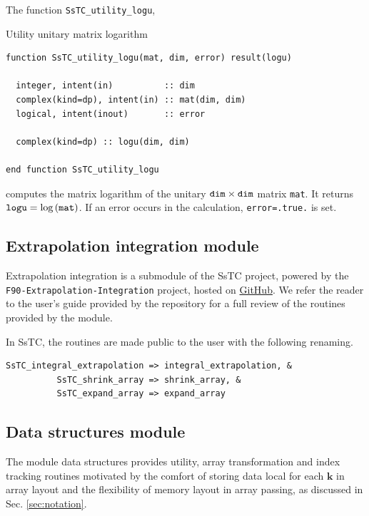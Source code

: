 \documentclass[10pt,a4paper]{article}
\begin{document}
The function \verb|SsTC_utility_logu|,
\begin{codebox}{Utility unitary matrix logarithm}
\begin{lstlisting}[caption={Interface of ``utility logarithm of matrix".},captionpos=b]
function SsTC_utility_logu(mat, dim, error) result(logu)

  integer, intent(in)          :: dim
  complex(kind=dp), intent(in) :: mat(dim, dim)
  logical, intent(inout)       :: error

  complex(kind=dp) :: logu(dim, dim)
  
end function SsTC_utility_logu
\end{lstlisting}
\end{codebox}
computes the matrix logarithm of the unitary $\verb|dim|\times\verb|dim|$ matrix \verb|mat|. It returns $\verb|logu| = \text{log}\left(\verb|mat|\right)$. If an error occurs in the calculation, \verb|error=.true.| is set.
\subsection{Extrapolation integration module}
Extrapolation integration is a submodule of the SsTC project, powered by the \\ \verb|F90-Extrapolation-Integration| project, hosted on \href{https://github.com/irukoa/F90-Extrapolation-Integration}{GitHub}. We refer the reader to the user's guide provided by the repository for a full review of the routines provided by the module.

In SsTC, the routines are made public to the user with the following renaming.
\begin{codebox}{}
\begin{lstlisting}[caption={Renaming of extrapolation routines.},captionpos=b]
SsTC_integral_extrapolation => integral_extrapolation, &
          SsTC_shrink_array => shrink_array, &
          SsTC_expand_array => expand_array
\end{lstlisting}
\end{codebox}
\subsection{Data structures module}\label{sec:data_structures}
The module data structures provides utility, array transformation and index tracking routines motivated by the comfort of storing data local for each $\bm{k}$ in array layout and the flexibility of memory layout in array passing, as discussed in Sec. \ref{sec:notation}.
\end{document}
